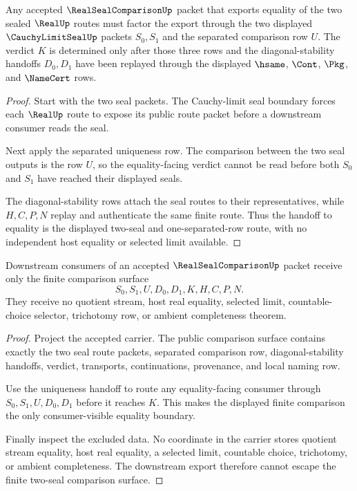 \begin{theorem}
\label{thm:real-seal-comparison-uniqueness-handoff}
Any accepted $\RealSealComparisonUp$ packet that exports equality of the two sealed $\RealUp$ routes must factor the export through the two displayed $\CauchyLimitSealUp$ packets $S_0,S_1$ and the separated comparison row $U$. The verdict $K$ is determined only after those three rows and the diagonal-stability handoffs $D_0,D_1$ have been replayed through the displayed $\hsame$, $\Cont$, $\Pkg$, and $\NameCert$ rows.
\end{theorem}
\begin{proof}
Start with the two seal packets. The Cauchy-limit seal boundary forces each $\RealUp$ route to expose its public route packet before a downstream consumer reads the seal.

Next apply the separated uniqueness row. The comparison between the two seal outputs is the row $U$, so the equality-facing verdict cannot be read before both $S_0$ and $S_1$ have reached their displayed seals.

The diagonal-stability rows attach the seal routes to their representatives, while $H,C,P,N$ replay and authenticate the same finite route. Thus the handoff to equality is the displayed two-seal and one-separated-row route, with no independent host equality or selected limit available.
\end{proof}

\begin{theorem}
\label{thm:real-seal-comparison-nonescape}
Downstream consumers of an accepted $\RealSealComparisonUp$ packet receive only the finite comparison surface
$$
S_0,S_1,U,D_0,D_1,K,H,C,P,N.
$$
They receive no quotient stream, host real equality, selected limit, countable-choice selector, trichotomy row, or ambient completeness theorem.
\end{theorem}
\begin{proof}
Project the accepted carrier. The public comparison surface contains exactly the two seal route packets, separated comparison row, diagonal-stability handoffs, verdict, transports, continuations, provenance, and local naming row.

Use the uniqueness handoff to route any equality-facing consumer through $S_0,S_1,U,D_0,D_1$ before it reaches $K$. This makes the displayed finite comparison the only consumer-visible equality boundary.

Finally inspect the excluded data. No coordinate in the carrier stores quotient stream equality, host real equality, a selected limit, countable choice, trichotomy, or ambient completeness. The downstream export therefore cannot escape the finite two-seal comparison surface.
\end{proof}

